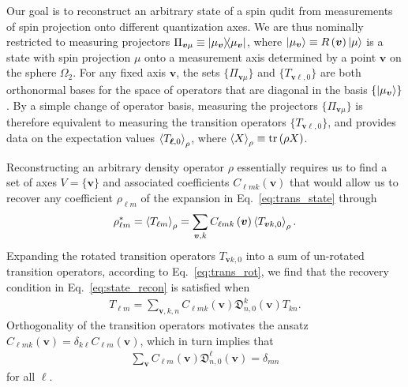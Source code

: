\documentclass[notitlepage,twocolumn]{revtex4-2}
\newcommand{\p}[1]{\left(#1\right)} %
\renewcommand{\set}[1]{\{#1\}} %
\newcommand{\bk}{\Braket} %
\renewcommand{\v}{\bm} %
\newcommand{\1}{\mathds{1}}
\newcommand{\D}{\mathfrak{D}}
\begin{document}
Our goal is to reconstruct an arbitrary state of a spin qudit from measurements of spin projection onto different quantization axes.
We are thus nominally restricted to measuring projectors $\Pi_{\v v\mu} \equiv \op{\mu_{\v v}}$, where $\ket{\mu_{\v v}}\equiv R\p{\v v}\ket{\mu}$ is a state with spin projection $\mu$ onto a measurement axis determined by a point $\v v$ on the sphere $\Omega_2$.
For any fixed axis $\v v$, the sets $\set{\Pi_{\v v\mu}}$ and $\set{T_{\v v\ell,0}}$ are both orthonormal bases for the space of operators that are diagonal in the basis $\set{\ket{\mu_{\v v}}}$.
By a simple change of operator basis, measuring the projectors $\set{\Pi_{\v v\mu}}$ is therefore equivalent to measuring the transition operators $\set{T_{\v v\ell,0}}$, and provides data on the expectation values $\bk{T_{\v \ell,0}}_\rho$, where $\bk{X}_\rho\equiv\tr\p{\rho X}$.

Reconstructing an arbitrary density operator $\rho$ essentially requires us to find a set of axes $V=\set{\v v}$ and associated coefficients $C_{\ell mk}\p{\v v}$ that would allow us to recover any coefficient $\rho_{\ell m}$ of the expansion in Eq.~\eqref{eq:trans_state} through
\begin{align}
  \rho_{\ell m}^* = \bk{T_{\ell m}}_\rho
  = \sum_{\v v,k} C_{\ell mk}\p{\v v} \bk{T_{\v vk,0}}_\rho.
  \label{eq:state_recon}
\end{align}
Expanding the rotated transition operators $T_{\v vk,0}$ into a sum of un-rotated transition operators, according to Eq.~\eqref{eq:trans_rot}, we find that the recovery condition in Eq.~\eqref{eq:state_recon} is satisfied when
\begin{align}
  T_{\ell m}
  = \sum_{\v v,k,n} C_{\ell mk}\p{\v v} \D^k_{n,0}\p{\v v} T_{kn}.
\end{align}
Orthogonality of the transition operators motivates the ansatz $C_{\ell mk}\p{\v v}=\delta_{k\ell}C_{\ell m}\p{\v v}$, which in turn implies that
\begin{align}
  \sum_{\v v} C_{\ell m}\p{\v v} \D^\ell_{n,0}\p{\v v} = \delta_{mn}
  \label{eq:tomo_recovery}
\end{align}
for all $\ell$.
\end{document}

